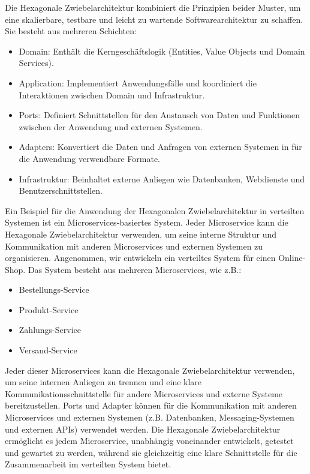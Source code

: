 Die Hexagonale Zwiebelarchitektur kombiniert die Prinzipien beider Muster, um eine skalierbare, testbare und leicht zu wartende Softwarearchitektur zu schaffen. Sie besteht aus mehreren Schichten:
\begin{itemize}
\item Domain: Enthält die Kerngeschäftslogik (Entities, Value Objects und Domain Services).
\item Application: Implementiert Anwendungsfälle und koordiniert die Interaktionen zwischen Domain und Infrastruktur.
\item Ports: Definiert Schnittstellen für den Austausch von Daten und Funktionen zwischen der Anwendung und externen Systemen.
\item Adapters: Konvertiert die Daten und Anfragen von externen Systemen in für die Anwendung verwendbare Formate.
\item Infrastruktur: Beinhaltet externe Anliegen wie Datenbanken, Webdienste und Benutzerschnittstellen.
\end{itemize}
Ein Beispiel für die Anwendung der Hexagonalen Zwiebelarchitektur in verteilten Systemen ist ein Microservices-basiertes System. Jeder Microservice kann die Hexagonale Zwiebelarchitektur verwenden, um seine interne Struktur und Kommunikation mit anderen Microservices und externen Systemen zu organisieren. Angenommen, wir entwickeln ein verteiltes System für einen Online-Shop. Das System besteht aus mehreren Microservices, wie z.B.:
\begin{itemize}
\item Bestellungs-Service
\item Produkt-Service
\item Zahlungs-Service
\item Versand-Service
\end{itemize}
Jeder dieser Microservices kann die Hexagonale Zwiebelarchitektur verwenden, um seine internen Anliegen zu trennen und eine klare Kommunikationsschnittstelle für andere Microservices und externe Systeme bereitzustellen. Ports und Adapter können für die Kommunikation mit anderen Microservices und externen Systemen (z.B. Datenbanken, Messaging-Systemen und externen APIs) verwendet werden. Die Hexagonale Zwiebelarchitektur ermöglicht es jedem Microservice, unabhängig voneinander entwickelt, getestet und gewartet zu werden, während sie gleichzeitig eine klare Schnittstelle für die Zusammenarbeit im verteilten System bietet.

